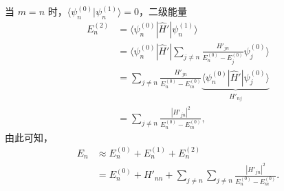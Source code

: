 当 $m=n$ 时，$\langle \psi_n^{(0)} | \psi_n^{(1)} \rangle = 0$，二级能量
\begin{align}
    E_n^{(2)} &= \langle \psi_n^{(0)} | \hat H' | \psi_n^{(1)} \rangle \\
    &= \langle \psi_n^{(0)} | \hat H' | \sum_{j\neq n}\frac{H'_{jn}}{E_n^{(0)} - E_j^{(0)}} \psi_j^{(0)} \rangle \\
    &= \sum_{j\neq n}\frac{H'_{jn}}{E_n^{(0)} - E_m^{(0)}}
    \underbrace{\langle \psi_n^{(0)} | \hat H' | \psi_j^{(0)} \rangle}_{H'_{nj}} \\
    &= \sum_{j\neq n}\frac{|H'_{jn}|^2}{E_n^{(0)} - E_m^{(0)}},
\end{align}
由此可知，
\begin{align}
    E_n &\approx E_n^{(0)} + E_n^{(1)} + E_n^{(2)} \\
    &= E_n^{(0)} + H'_{nn} + \sum_{j\neq n} \sum_{j\neq n}\frac{|H'_{jn}|^2}{E_n^{(0)} - E_m^{(0)}}. 
\end{align}

